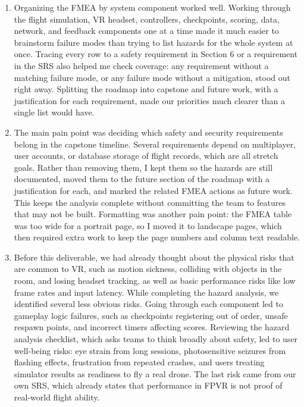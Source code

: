 \documentclass{article}
\begin{document}
\begin{enumerate}
    \item %
    Organizing the FMEA by system component worked well. Working through the
    flight simulation, VR headset, controllers, checkpoints, scoring, data,
    network, and feedback components one at a time made it much easier to
    brainstorm failure modes than trying to list hazards for the whole system
    at once. Tracing every row to a safety requirement in Section 6 or a
    requirement in the SRS also helped me check coverage: any requirement
    without a matching failure mode, or any failure mode without a mitigation,
    stood out right away. Splitting the roadmap into capstone and future work,
    with a justification for each requirement, made our priorities much
    clearer than a single list would have.

    \item %
    The main pain point was deciding which safety and security requirements
    belong in the capstone timeline. Several requirements depend on
    multiplayer, user accounts, or database storage of flight records, which
    are all stretch goals. Rather than removing them,
    I kept them so the hazards are still documented, moved them to the future
    section of the roadmap with a justification for each, and marked the
    related FMEA actions as future work. This keeps the analysis complete
    without committing the team to features that may not be built. Formatting was another pain point: the FMEA table was too
    wide for a portrait page, so I moved it to landscape pages, which then
    required extra work to keep the page numbers and column text readable.

    \item %
    Before this deliverable, we had already thought about the physical risks
    that are common to VR, such as motion sickness, colliding with objects in
    the room, and losing headset tracking, as well as basic performance risks
    like low frame rates and input latency. While completing the hazard
    analysis, we identified several less obvious risks. Going through each
    component led to gameplay logic failures, such as checkpoints registering
    out of order, unsafe respawn points, and incorrect timers affecting scores.
    Reviewing the hazard analysis checklist, which asks teams to think broadly
    about safety, led to user well-being risks: eye strain from long sessions,
    photosensitive seizures from flashing effects, frustration from repeated
    crashes, and users treating simulator results as readiness to fly a real
    drone. The last risk came from our own SRS, which already states that
    performance in FPVR is not proof of real-world flight ability.


\end{enumerate}
\end{document}

